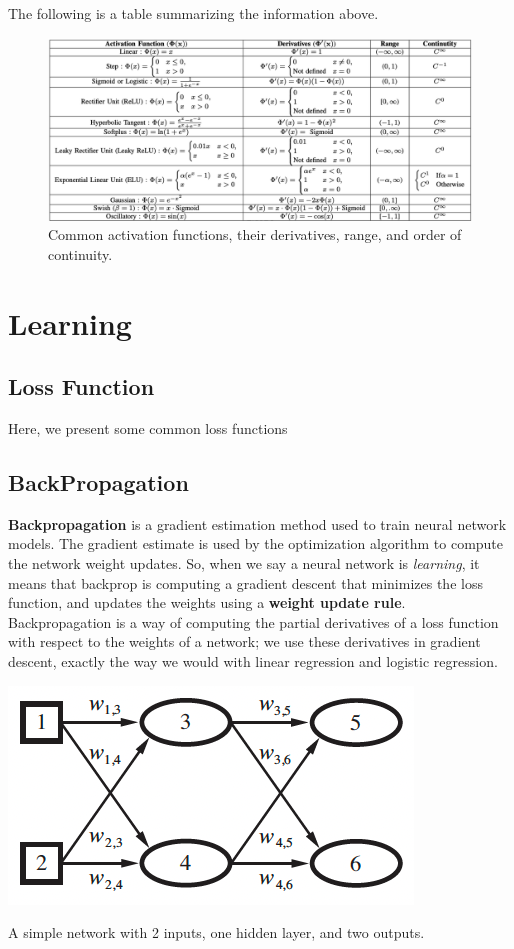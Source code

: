 \documentclass{tufte-handout}
\begin{document}
The following is a table summarizing the information above. \begin{figure}
\includegraphics{ActFunTable}
\caption{Common activation functions, their derivatives, range, and order of continuity.}
\end{figure}

\newpage
\section{Learning}
  \label{sec:Learning}
\subsection{Loss Function}%
  \label{sub:Loss Function}
  Here, we present some common loss functions\cite{ciampiconi2023survey}
\subsection{BackPropagation}%
  \label{sub:BackPropagation}
\textbf{Backpropagation} is a gradient estimation method used to train neural network models. The gradient estimate is used by the optimization algorithm to compute the network weight updates. So, when we say a neural network is \textit{learning}, it means that backprop is computing a gradient descent that minimizes the loss function, and updates the weights using a \textbf{weight update rule}. Backpropagation is a way of computing the partial derivatives of a loss function with respect to the weights of a network; we use these derivatives in gradient descent, exactly the way we would with linear regression and logistic regression. 
\begin{marginfigure}
  \includegraphics{simpleNet}
  \label{simpleNet}
  \caption{A simple network with 2 inputs, one hidden layer, and two outputs.}
\end{marginfigure}
\end{document}
